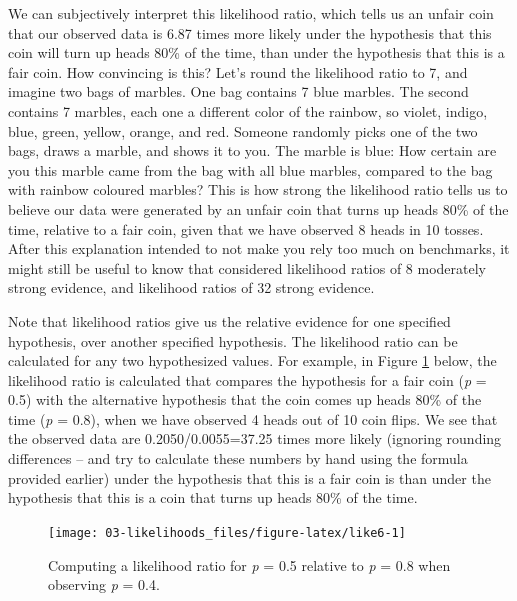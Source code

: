 \documentclass[
  oneside]{book}
\begin{document}
We can subjectively interpret this likelihood ratio, which tells us an unfair coin that our observed data is 6.87 times more likely under the hypothesis that this coin will turn up heads 80\% of the time, than under the hypothesis that this is a fair coin. How convincing is this? Let's round the likelihood ratio to 7, and imagine two bags of marbles. One bag contains 7 blue marbles. The second contains 7 marbles, each one a different color of the rainbow, so violet, indigo, blue, green, yellow, orange, and red. Someone randomly picks one of the two bags, draws a marble, and shows it to you. The marble is blue: How certain are you this marble came from the bag with all blue marbles, compared to the bag with rainbow coloured marbles? This is how strong the likelihood ratio tells us to believe our data were generated by an unfair coin that turns up heads 80\% of the time, relative to a fair coin, given that we have observed 8 heads in 10 tosses. After this explanation intended to not make you rely too much on benchmarks, it might still be useful to know that \citet{royall_statistical_1997} considered likelihood ratios of 8 moderately strong evidence, and likelihood ratios of 32 strong evidence.

Note that likelihood ratios give us the relative evidence for one specified hypothesis, over another specified hypothesis. The likelihood ratio can be calculated for any two hypothesized values. For example, in Figure \ref{fig:like6} below, the likelihood ratio is calculated that compares the hypothesis for a fair coin (\emph{p} = 0.5) with the alternative hypothesis that the coin comes up heads 80\% of the time (\emph{p} = 0.8), when we have observed 4 heads out of 10 coin flips. We see that the observed data are 0.2050/0.0055=37.25 times more likely (ignoring rounding differences -- and try to calculate these numbers by hand using the formula provided earlier) under the hypothesis that this is a fair coin is than under the hypothesis that this is a coin that turns up heads 80\% of the time.



\begin{figure}

{\centering \texttt{[image: 03-likelihoods\_files/figure-latex/like6-1]} 

}

\caption{Computing a likelihood ratio for \emph{p} = 0.5 relative to \emph{p} = 0.8 when observing \emph{p} = 0.4.}\label{fig:like6}
\end{figure}
\end{document}
